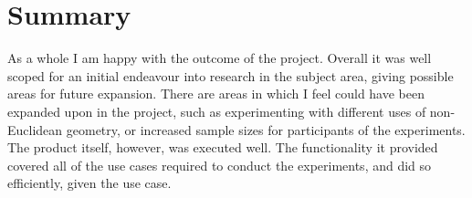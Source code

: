 	\section{Summary}

		As a whole I am happy with the outcome of the project.
		Overall it was well scoped for an initial endeavour into research in the subject area, giving possible areas for future expansion.
		There are areas in which I feel could have been expanded upon in the project, such as experimenting with different uses of non-Euclidean geometry, or increased sample sizes for participants of the experiments.
		The product itself, however, was executed well.
		The functionality it provided covered all of the use cases required to conduct the experiments, and did so efficiently, given the use case.

